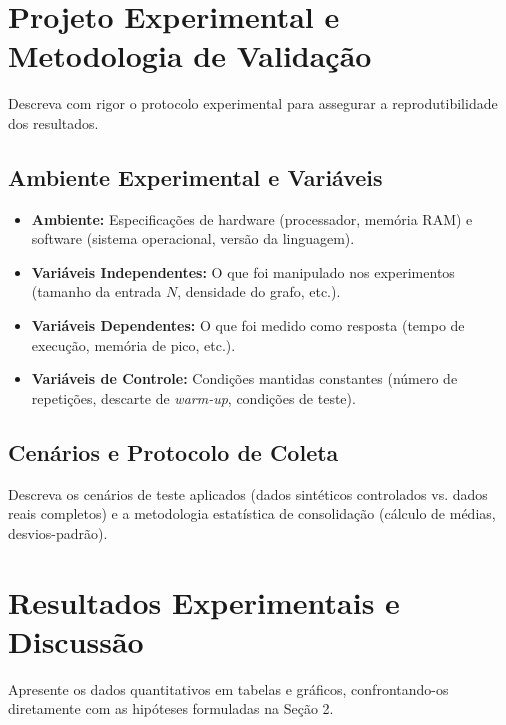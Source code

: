 \documentclass[11pt,a4paper]{article}
\begin{document}
\section{Projeto Experimental e Metodologia de Validação}

\begin{instrucao}
Descreva com rigor o protocolo experimental para assegurar a reprodutibilidade dos resultados.
\end{instrucao}

\subsection{Ambiente Experimental e Variáveis}
\begin{itemize}
    \item \textbf{Ambiente:} Especificações de hardware (processador, memória RAM) e software (sistema operacional, versão da linguagem).
    \item \textbf{Variáveis Independentes:} O que foi manipulado nos experimentos (tamanho da entrada $N$, densidade do grafo, etc.).
    \item \textbf{Variáveis Dependentes:} O que foi medido como resposta (tempo de execução, memória de pico, etc.).
    \item \textbf{Variáveis de Controle:} Condições mantidas constantes (número de repetições, descarte de \textit{warm-up}, condições de teste).
\end{itemize}

\subsection{Cenários e Protocolo de Coleta}
Descreva os cenários de teste aplicados (dados sintéticos controlados vs. dados reais completos) e a metodologia estatística de consolidação (cálculo de médias, desvios-padrão).

\section{Resultados Experimentais e Discussão}

\begin{instrucao}
Apresente os dados quantitativos em tabelas e gráficos, confrontando-os diretamente com as hipóteses formuladas na Seção 2.
\end{instrucao}
\end{document}
